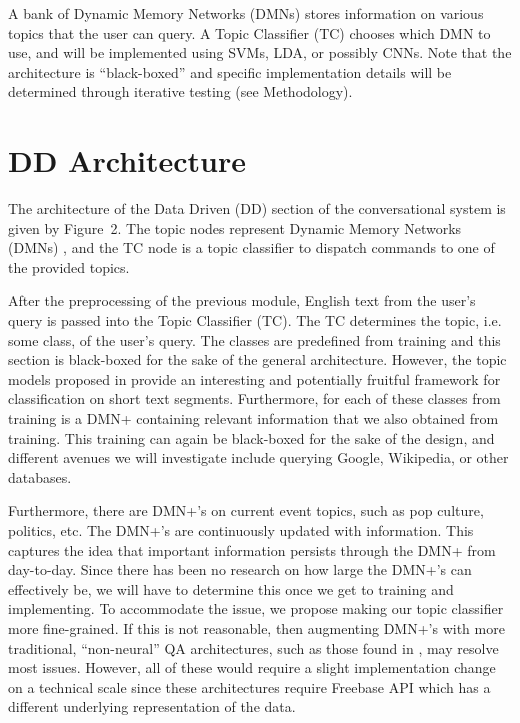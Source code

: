\documentclass[10pt,twoside,twocolumn]{article}
\begin{document}
\noindent
A bank of Dynamic Memory Networks (DMNs) \cite{Kumar:2015, Xiong2016} stores information on various topics that the user can query. A Topic Classifier (TC) chooses which DMN to use, and will be implemented using SVMs\cite{Joachims1998, Pilaszy2005}, LDA\cite{Blei2001, Zhao2011}, or possibly CNNs\cite{Kim2014}. Note that the architecture is ``black-boxed'' and specific implementation details will be determined through iterative testing (see Methodology).

\section{DD Architecture}
The architecture of the Data Driven (DD) section of the conversational system is given by Figure~2. The topic nodes represent Dynamic Memory Networks (DMNs) \cite{Kumar:2015, Xiong2016}, and the TC node is a topic classifier to dispatch commands to one of the provided topics.

\noindent
After the preprocessing of the previous module, English text from the user's query is passed into the Topic Classifier (TC). The TC determines the topic, i.e. some class, of the user's query. The classes are predefined from training and this section is black-boxed for the sake of the general architecture. However, the topic models proposed in \cite{Zhao2011} provide an interesting and potentially fruitful framework for classification on short text segments. Furthermore, for each of these classes from training is a DMN+ \cite{Xiong2016} containing relevant information that we also obtained from training. This training can again be black-boxed for the sake of the design, and different avenues we will investigate include querying Google, Wikipedia, or other databases.

\noindent
Furthermore, there are DMN+'s on current event topics, such as pop culture, politics, etc. The DMN+'s are continuously updated with information. This captures the idea that important information persists through the DMN+ from day-to-day. Since there has been no research on how large the DMN+'s can effectively be, we will have to determine this once we get to training and implementing. To accommodate the issue, we propose making our topic classifier more fine-grained. If this is not reasonable, then augmenting DMN+'s with more traditional, ``non-neural'' QA architectures, such as those found in \cite{Iyyer2014, Yao2014a, Yao2014b}, may resolve most issues. However, all of these would require a slight implementation change on a technical scale since these architectures require Freebase API which has a different underlying representation of the data.
\end{document}
